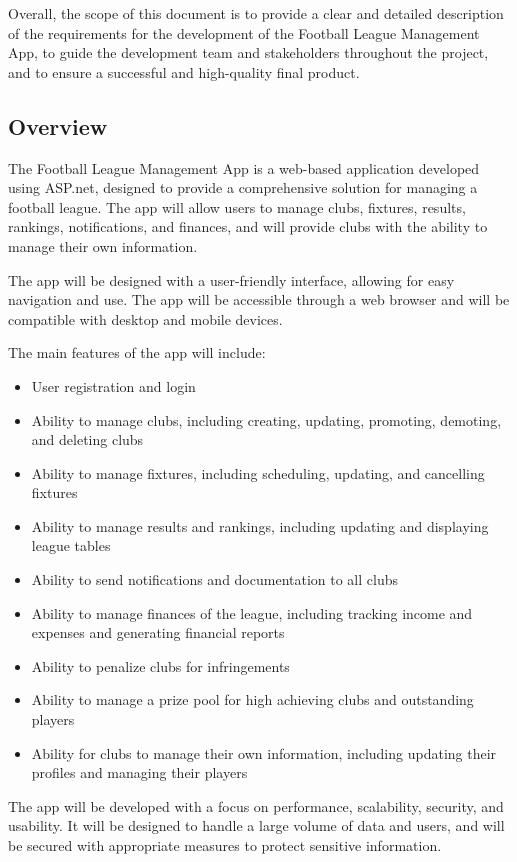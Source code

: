 \documentclass[12pt]{article}
\begin{document}
Overall, the scope of this document is to provide a clear and detailed description of the requirements for the development of the Football League Management App, to guide the development team and stakeholders throughout the project, and to ensure a successful and high-quality final product.
\subsection{Overview}
The Football League Management App is a web-based application developed using ASP.net, designed to provide a comprehensive solution for managing a football league. The app will allow users to manage clubs, fixtures, results, rankings, notifications, and finances, and will provide clubs with the ability to manage their own information.

The app will be designed with a user-friendly interface, allowing for easy navigation and use. The app will be accessible through a web browser and will be compatible with desktop and mobile devices.

The main features of the app will include:
\begin{itemize}
    \item User registration and login
    \item Ability to manage clubs, including creating, updating, promoting, demoting, and deleting clubs
    \item Ability to manage fixtures, including scheduling, updating, and cancelling fixtures
    \item Ability to manage results and rankings, including updating and displaying league tables
    \item Ability to send notifications and documentation to all clubs
    \item Ability to manage finances of the league, including tracking income and expenses and generating financial reports
    \item Ability to penalize clubs for infringements
    \item Ability to manage a prize pool for high achieving clubs and outstanding players
    \item Ability for clubs to manage their own information, including updating their profiles and managing their players
\end{itemize}
The app will be developed with a focus on performance, scalability, security, and usability. It will be designed to handle a large volume of data and users, and will be secured with appropriate measures to protect sensitive information.
\end{document}
